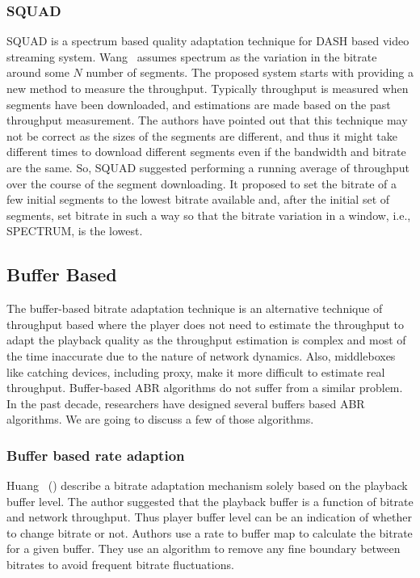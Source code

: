 \subsubsection{SQUAD}
SQUAD\cite{10.1145/2910017.2910593} is a spectrum\cite{1386243} based quality adaptation technique for DASH based video streaming system. Wang \etal\ assumes spectrum as the variation in the bitrate around some $N$ number of segments. The proposed system starts with providing a new method to measure the throughput. Typically throughput is measured when segments have been downloaded, and estimations are made based on the past throughput measurement. The authors have pointed out that this technique may not be correct as the sizes of the segments are different, and thus it might take different times to download different segments even if the bandwidth and bitrate are the same. So, SQUAD suggested performing a running average of throughput over the course of the segment downloading. It proposed to set the bitrate of a few initial segments to the lowest bitrate available and, after the initial set of segments, set bitrate in such a way so that the bitrate variation in a window, i.e., SPECTRUM, is the lowest.


\subsection{Buffer Based}
The buffer-based bitrate adaptation technique is an alternative technique of throughput based where the player does not need to estimate the throughput to adapt the playback quality as the throughput estimation is complex and most of the time inaccurate due to the nature of network dynamics. Also, middleboxes like catching devices, including proxy, make it more difficult to estimate real throughput. Buffer-based ABR algorithms do not suffer from a similar problem. In the past decade, researchers have designed several buffers based ABR algorithms. We are going to discuss a few of those algorithms.

\subsubsection{Buffer based rate adaption}
Huang \etal\ (\cite{10.1145/2619239.2626296,10.1145/2398776.2398800,10.1145/2491172.2491179}) describe a bitrate adaptation mechanism solely based on the playback buffer level. The author suggested that the playback buffer is a function of bitrate and network throughput. Thus player buffer level can be an indication of whether to change bitrate or not. Authors use a rate to buffer map to calculate the bitrate for a given buffer. They use an algorithm to remove any fine boundary between bitrates to avoid frequent bitrate fluctuations.

